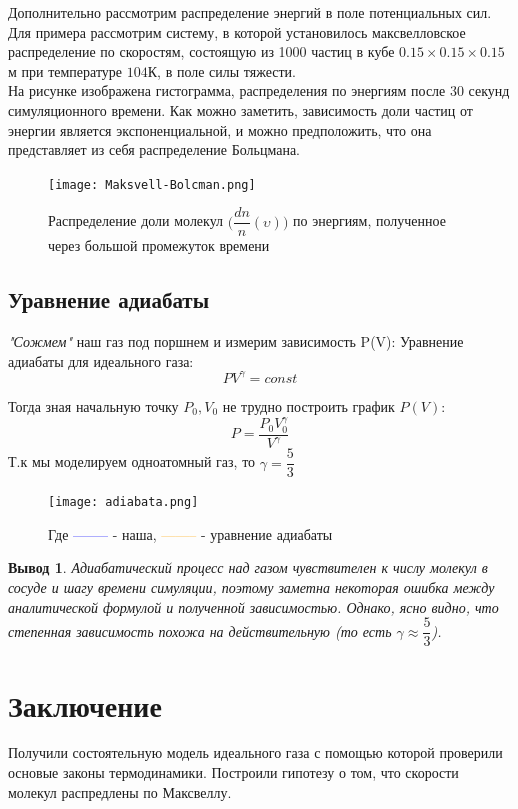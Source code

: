 \documentclass[twoside,twocolumn, 11pt]{article}
\theoremstyle{plain}
\newtheorem{conclusion}{Вывод}
\theoremstyle{definition}
\begin{document}
Дополнительно рассмотрим распределение энергий в поле потенциальных сил. Для примера рассмотрим систему, в которой установилось максвелловское распределение по скоростям, состоящую из 1000 частиц в кубе $0.15 \times 0.15 \times 0.15$м при температуре $104$К, в поле силы тяжести.\\
\indent На рисунке изображена гистограмма, распределения по энергиям после 30 секунд симуляционного времени. Как можно заметить, зависимость доли частиц от энергии является экспоненциальной, и можно предположить, что она представляет из себя распределение Больцмана.

\begin{figure}[!h]
{\texttt{[image: Maksvell-Bolcman.png]}}
\caption{Распределение доли молекул $\Big(\dfrac{dn}{n} (\upsilon) \Big)$ по энергиям, полученное через большой промежуток времени}
\end{figure}

\subsection{Уравнение адиабаты}
\textit{"Сожмем"} наш газ под поршнем и измерим зависимость P(V):
Уравнение адиабаты для идеального газа:
\[PV^\gamma = const \]

Тогда зная начальную точку $P_0, V_0$ не трудно построить график $P(V)$:
\[P = \dfrac{P_0 V_0^\gamma}{V ^\gamma} \]
Т.к мы моделируем одноатомный газ, то $\gamma = \dfrac{5}{3}$

\begin{figure}[!h]
{\texttt{[image: adiabata.png]}}
\caption{}
Где \textcolor{blue}{--------} - наша, \textcolor{orange}{--------} - уравнение адиабаты
\end{figure}

\begin{conclusion}
Адиабатический процесс над газом чувствителен к числу молекул в сосуде и шагу времени симуляции, поэтому заметна некоторая
ошибка между аналитической формулой и полученной зависимостью. Однако, ясно видно, что степенная зависимость
похожа на действительную (то есть $\gamma \approx \dfrac{5}{3}$).
\end{conclusion}

\section{Заключение}
\indent Получили состоятельную модель идеального газа с помощью которой проверили основые законы термодинамики. Построили гипотезу о том,
что скорости молекул распредлены по Максвеллу.
\end{document}
